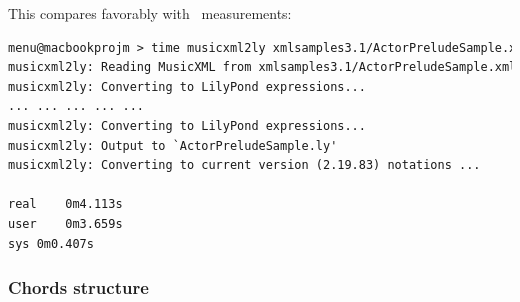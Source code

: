 \documentclass[12pt,a4paper]{article}
\begin{document}
This compares favorably with \mxmlToLy\ measurements:
\begin{lstlisting}[language=XML]
menu@macbookprojm > time musicxml2ly xmlsamples3.1/ActorPreludeSample.xml 
musicxml2ly: Reading MusicXML from xmlsamples3.1/ActorPreludeSample.xml ...
musicxml2ly: Converting to LilyPond expressions...
... ... ... ... ...
musicxml2ly: Converting to LilyPond expressions...
musicxml2ly: Output to `ActorPreludeSample.ly'
musicxml2ly: Converting to current version (2.19.83) notations ...

real	0m4.113s
user	0m3.659s
sys	0m0.407s
\end{lstlisting}

\subsubsection{Chords structure}
\end{document}

